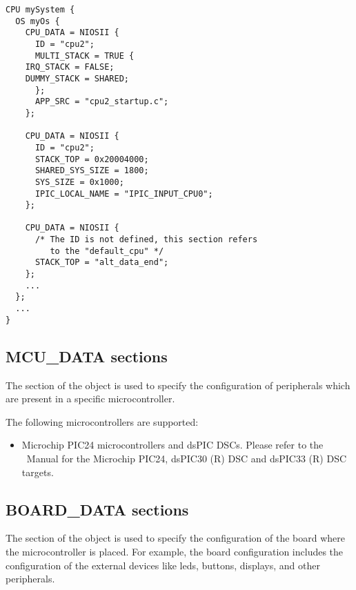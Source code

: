 \begin{lstlisting}
CPU mySystem {
  OS myOs {
    CPU_DATA = NIOSII {
      ID = "cpu2";
      MULTI_STACK = TRUE {
	IRQ_STACK = FALSE;
	DUMMY_STACK = SHARED;
      };
      APP_SRC = "cpu2_startup.c";
    };
    
    CPU_DATA = NIOSII {
      ID = "cpu2";
      STACK_TOP = 0x20004000;
      SHARED_SYS_SIZE = 1800;
      SYS_SIZE = 0x1000; 
      IPIC_LOCAL_NAME = "IPIC_INPUT_CPU0";
    };
    
    CPU_DATA = NIOSII {
      /* The ID is not defined, this section refers
         to the "default_cpu" */
      STACK_TOP = "alt_data_end";
    };
    ...
  };
  ...
}
\end{lstlisting}

%

\subsection{MCU\_DATA sections}

The  section of the  object is used to specify
the configuration of peripherals which are present in a specific
microcontroller.

The following microcontrollers are supported:
\begin{itemize}
\item Microchip PIC24 microcontrollers and dsPIC DSCs. Please refer to
  the \ee\ Manual for the Microchip PIC24, dsPIC30 (R) DSC and dsPIC33
  (R) DSC targets.
\end{itemize}

\subsection{BOARD\_DATA sections}

The  section of the  object is used to
specify the configuration of the board where the microcontroller is
placed. For example, the board configuration includes the
configuration of the external devices like leds, buttons, displays,
and other peripherals.

